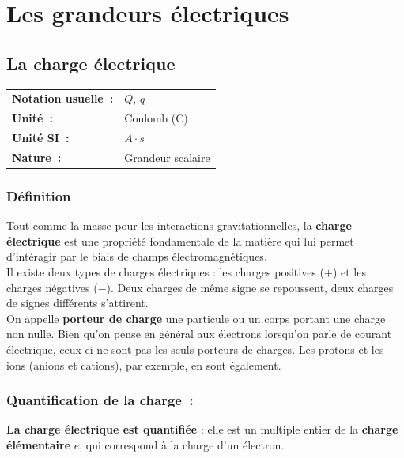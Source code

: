 \chapter{Les grandeurs électriques}

\section{La charge électrique}

\begin{tabular}{ll}
\textbf{Notation usuelle~:} & $Q$, $q$ \\
\textbf{Unité~:} & Coulomb (C) \\
\textbf{Unité SI~:} & $A \cdot s $ \\
\textbf{Nature~:} & Grandeur scalaire \\
\end{tabular} 

\subsection*{Définition}


Tout comme la masse pour les interactions gravitationnelles, la \textbf{charge électrique} est une propriété fondamentale de la matière qui lui permet d'intéragir par le biais de champs électromagnétiques. \\ 

Il existe deux types de charges électriques : les charges positives ($+$) et les charges négatives ($-$). Deux charges de même signe se repoussent, deux charges de signes différents s'attirent.\\

On appelle \textbf{porteur de charge} une particule ou un corps portant une charge non nulle. Bien qu'on pense en général aux électrons lorsqu'on parle de courant électrique, ceux-ci ne sont pas les seuls porteurs de charges. Les protons et les ions (anions et cations), par exemple, en sont également. 


\subsection*{ Quantification de la charge~: }

\textbf{La charge électrique est quantifiée} : elle est un multiple entier de la \textbf{charge élémentaire} $e$, qui correspond à la charge d'un électron.

